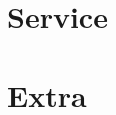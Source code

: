 \documentclass[letterpaper, 10.5pt, sans]{moderncv}
\begin{document}




% 

\vspace{-5pt}
\section{Service}









\vspace{-5pt}
\section{Extra}

\vspace{-5pt}


\end{document}

